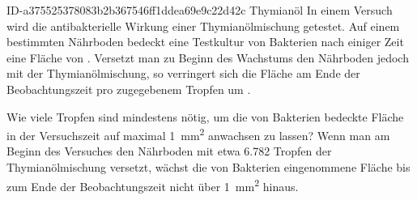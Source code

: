 \begin{exercise}
      {ID-a375525378083b2b367546ff1ddea69e9c22d42c}
      {Thymianöl}
  \ifproblem\problem
    In einem Versuch wird die antibakterielle Wirkung einer
    Thymianölmischung getestet. Auf einem bestimmten Nährboden
    bedeckt eine Testkultur von Bakterien nach einiger Zeit
    eine Fläche von . Versetzt man zu Beginn des Wachstums
    den Nährboden jedoch mit der Thymianölmischung, so verringert
    sich die Fläche am Ende der Beobachtungszeit pro zugegebenem
    Tropfen um .\par
    Wie viele Tropfen sind mindestens nötig, um die von Bakterien
    bedeckte Fläche in der Versuchszeit auf maximal
    \SI{1}{\square\milli\metre} anwachsen zu lassen?
  \fi
  \ifoutcome\outcome
    Wenn man am Beginn des Versuches den Nährboden mit etwa
    \num{6.782} Tropfen der Thymianölmischung versetzt, wächst
    die von Bakterien eingenommene Fläche bis zum Ende der
    Beobachtungszeit nicht über \SI{1}{\square\milli\metre} hinaus.
  \fi
\end{exercise}
